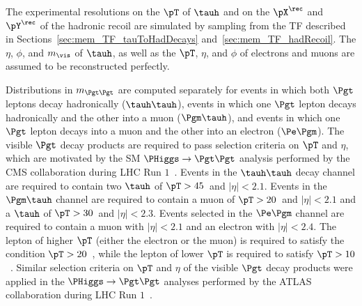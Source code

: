 The experimental resolutions on the $\pT$ of $\tauh$ and on the $\pX^{\rec}$ and $\pY^{\rec}$ of the hadronic recoil 
are simulated by sampling from the TF described in
Sections~\ref{sec:mem_TF_tauToHadDecays}
and~\ref{sec:mem_TF_hadRecoil}.
The $\eta$, $\phi$, and $m_{\vis}$ of $\tauh$,
as well as the $\pT$, $\eta$, and $\phi$ of electrons and muons are assumed to be reconstructed perfectly.

Distributions in $m_{\Pgt\Pgt}$ are computed separately for events in which 
both $\Pgt$ leptons decay hadronically ($\tauh\tauh$), 
events in which one $\Pgt$ lepton decays hadronically and the other into a muon ($\Pgm\tauh$),
and events in which one $\Pgt$ lepton decays into a muon and the other into an electron ($\Pe\Pgm$).
The visible $\Pgt$ decay products are required to pass selection criteria on $\pT$ and $\eta$,
which are motivated by the SM $\PHiggs \to \Pgt\Pgt$ analysis performed by the CMS collaboration during LHC Run $1$~\cite{HIG-13-004}.
Events in the $\tauh\tauh$ decay channel are required to contain
two $\tauh$ of $\pT > 45$~\GeV and $\vert\eta\vert < 2.1$.
Events in the $\Pgm\tauh$ channel
are required to contain a muon of $\pT > 20$~\GeV and $\vert\eta\vert < 2.1$ and a $\tauh$ of $\pT > 30$~\GeV and $\vert\eta\vert < 2.3$.
Events selected in the $\Pe\Pgm$ channel are required to contain a muon with $\vert\eta\vert < 2.1$ and an electron with $\vert\eta\vert < 2.4$.
The lepton of higher $\pT$ (either the electron or the muon) is required to satisfy the condition $\pT > 20$~\GeV,
while the lepton of lower $\pT$ is required to satisfy $\pT > 10$~\GeV.
Similar selection criteria on $\pT$ and $\eta$ of the visible $\Pgt$ decay products were applied in the $\PHiggs \to \Pgt\Pgt$
analyses performed by the ATLAS
collaboration during LHC Run $1$~\cite{ATLAS_HiggsTauTau_SM,ATLAS_HiggsTauTau_MSSM}.

